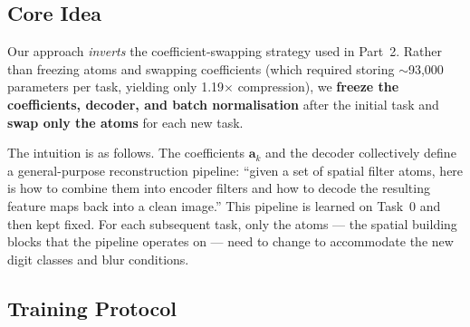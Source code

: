 \documentclass[11pt,letterpaper]{article}
\newcommand{\avec}{\mathbf{a}}
\begin{document}
\subsection{Core Idea}

Our approach \emph{inverts} the coefficient-swapping strategy used in Part~2.
Rather than freezing atoms and swapping coefficients (which required storing
$\sim$93{,}000 parameters per task, yielding only 1.19$\times$ compression),
we \textbf{freeze the coefficients, decoder, and batch normalisation} after the
initial task and \textbf{swap only the atoms} for each new task.

The intuition is as follows.  The coefficients $\avec_k$ and the decoder
collectively define a general-purpose reconstruction pipeline: ``given a set of
spatial filter atoms, here is how to combine them into encoder filters and
how to decode the resulting feature maps back into a clean image.''  This
pipeline is learned on Task~0 and then kept fixed.  For each subsequent task,
only the atoms --- the spatial building blocks that the pipeline operates on
--- need to change to accommodate the new digit classes and blur conditions.

\subsection{Training Protocol}
\end{document}
